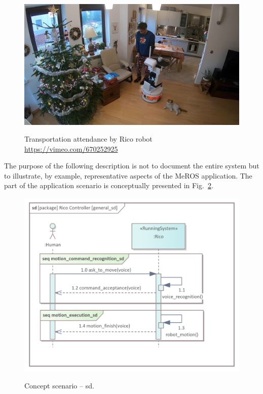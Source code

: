 \documentclass{ieeeaccess}
\begin{document}
	\begin{figure}[htb]
		\centering
		\begin{center}
			{\includegraphics[width=.9\columnwidth]{img/herbatka_u_winiara.jpg}}
		\end{center}
		\caption{Transportation attendance by Rico robot \url{https://vimeo.com/670252925}} 
		\label{fig:herbatka_u_winiara}
	\end{figure}
	
	 The purpose of the following description is not to document the entire system but to illustrate, by example, representative aspects of the MeROS application.
		The part of the application scenario is conceptually presented in Fig.~\ref{fig:general_sd}.
	
	\begin{figure}[htb] 
		\centering
		\begin{center}
			{\includegraphics[scale=0.67]{img/rico_pkg/general_sd.png}}
		\end{center}
		\caption{Concept scenario -- sd.} 
		\label{fig:general_sd}
	\end{figure}
	
\end{document}
